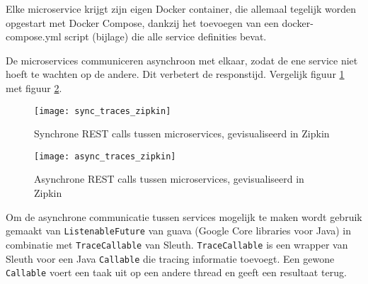 Elke microservice krijgt zijn eigen Docker container, die allemaal tegelijk worden opgestart met Docker Compose, dankzij het toevoegen van een docker-compose.yml script (bijlage) die alle service definities bevat.

De microservices communiceren asynchroon met elkaar, zodat de ene service niet hoeft te wachten op de andere. Dit verbetert de responstijd. Vergelijk figuur \ref{fig:sync_rest} met figuur \ref{fig:async_rest}.

\begin{figure}
\caption{Synchrone REST calls tussen microservices, gevisualiseerd in Zipkin}
\centering
\texttt{[image: sync\_traces\_zipkin]}
\label{fig:sync_rest}
\end{figure}

\begin{figure}
\caption{Asynchrone REST calls tussen microservices, gevisualiseerd in Zipkin}
\centering
\texttt{[image: async\_traces\_zipkin]}
\label{fig:async_rest}
\end{figure} 

Om de asynchrone communicatie tussen services mogelijk te maken wordt gebruik gemaakt van \texttt{ListenableFuture} van guava (Google Core libraries voor Java) in combinatie met \texttt{TraceCallable} van Sleuth. \texttt{TraceCallable} is een wrapper van Sleuth voor een Java \texttt{Callable} die tracing informatie toevoegt. Een gewone \texttt{Callable} voert een taak uit op een andere thread en geeft een resultaat terug.

